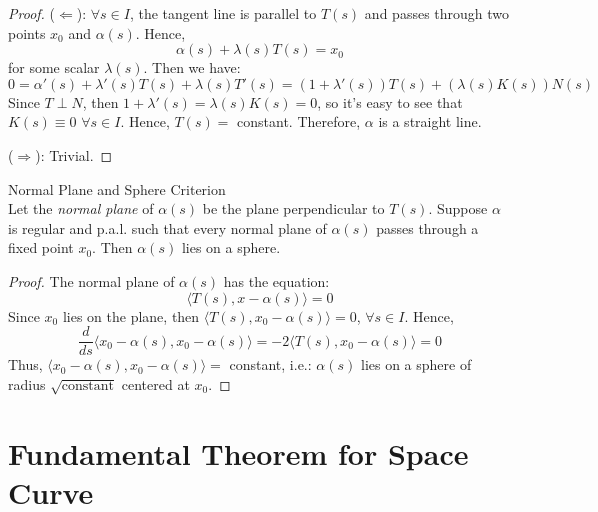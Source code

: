 \begin{proof}
($\Leftarrow$): $\forall s\in I$, the tangent line is parallel to $T(s)$ and passes through two points $x_0$ and $\alpha(s)$. Hence,
\[
\alpha(s) + \lambda(s)T(s) = x_0
\]
for some scalar $\lambda(s)$. Then we have:
\[
0 = \alpha'(s) + \lambda'(s)T(s) + \lambda(s)T'(s) = (1 + \lambda'(s))T(s) + (\lambda(s)K(s))N(s)
\]
Since $T\perp N$, then $1 + \lambda'(s) = \lambda(s)K(s) = 0$, so it's easy to see that $K(s)\equiv 0$ $\forall s\in I$. Hence, $T(s) = $ constant. Therefore, $\alpha$ is a straight line.

\noindent ($\Rightarrow$): Trivial.
\end{proof}


\begin{proposition}{Normal Plane and Sphere Criterion}\\
Let the \textit{normal plane} of $\alpha(s)$ be the plane perpendicular to $T(s)$. Suppose $\alpha$ is regular and p.a.l. such that every normal plane of $\alpha(s)$ passes through a fixed point $x_0$. Then $\alpha(s)$ lies on a sphere.
\end{proposition}

\begin{proof}
The normal plane of $\alpha(s)$ has the equation:
\[
\langle T(s), x - \alpha(s)\rangle = 0
\]
Since $x_0$ lies on the plane, then $\langle T(s), x_0 - \alpha(s)\rangle = 0$, $\forall s\in I$. Hence,
\[
\frac{d}{ds}\langle x_0 - \alpha(s), x_0 - \alpha(s)\rangle = -2\langle T(s), x_0 - \alpha(s)\rangle = 0
\]
Thus, $\langle x_0 - \alpha(s), x_0 - \alpha(s)\rangle = $ constant, i.e.: $\alpha(s)$ lies on a sphere of radius $\sqrt{\text{constant}}$ centered at $x_0$.
\end{proof}

\section{Fundamental Theorem for Space Curve}

